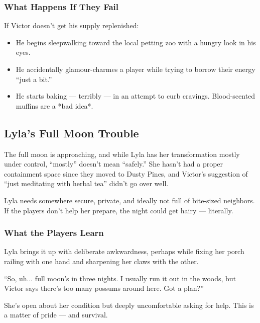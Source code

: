 \subsubsection*{What Happens If They Fail}
If Victor doesn’t get his supply replenished:
\begin{itemize}
    \item He begins sleepwalking toward the local petting zoo with a hungry look in his eyes.
    \item He accidentally glamour-charmes a player while trying to borrow their energy “just a bit.”
    \item He starts baking — terribly — in an attempt to curb cravings. Blood-scented muffins are a *bad idea*.
\end{itemize}




\subsection{Lyla’s Full Moon Trouble}

The full moon is approaching, and while Lyla has her transformation mostly under control, “mostly” doesn’t mean “safely.” She hasn’t had a proper containment space since they moved to Dusty Pines, and Victor’s suggestion of “just meditating with herbal tea” didn’t go over well.

Lyla needs somewhere secure, private, and ideally not full of bite-sized neighbors. If the players don’t help her prepare, the night could get hairy — literally.

\subsubsection*{What the Players Learn}
Lyla brings it up with deliberate awkwardness, perhaps while fixing her porch railing with one hand and sharpening her claws with the other.

\begin{Example}{}
    “So, uh... full moon’s in three nights. I usually run it out in the woods, but Victor says there’s too many possums around here. Got a plan?”
\end{Example}

She’s open about her condition but deeply uncomfortable asking for help. This is a matter of pride — and survival.

